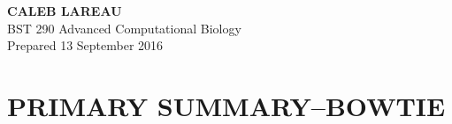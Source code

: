 \documentclass[12pt]{article}
\begin{document}
\begin{minipage}[t]{0.5\linewidth}
    \begin{flushleft}
    \textbf{
    {\huge C}{\Large ALEB} \hspace{-0.1em} 
    {\huge L}{\Large AREAU}}\\
     \hspace*{4mm} BST 290 Advanced Computational Biology \\
     \hspace*{4mm} Prepared 13 September 2016
         \end{flushleft}
\end{minipage}

 
 
\section*{\textbf{{\Large P}{\small RIMARY} {\Large S}{\small UMMARY}{\Large --B}{\small OWTIE}}}
\end{document}
